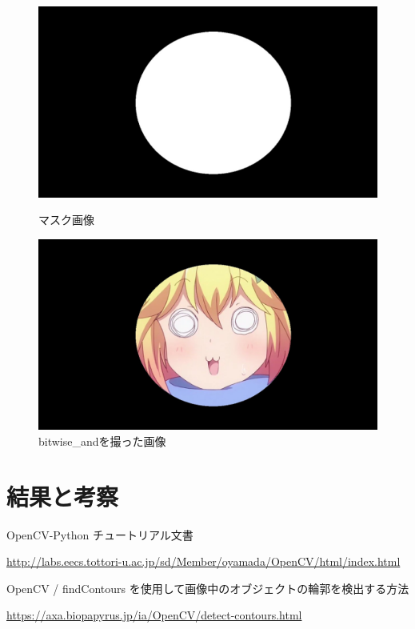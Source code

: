 \documentclass[dvipdfmx]{jsarticle}
\begin{document}
\begin{figure}
  \begin{minipage}{0.5\hsize}
    \centering
    \includegraphics[width=0.9\hsize]{../pic/black.jpg}
    \caption{マスク画像}
    \label{fig:mask1}
  \end{minipage}
  \begin{minipage}{0.5\hsize}
    \centering
    \includegraphics[width=0.9\hsize]{../pic/tapu_icon.jpg}
    \caption{bitwise\_andを撮った画像}
    \label{fig:masked1}
  \end{minipage}
\end{figure}




\section{結果と考察}



\begin{thebibliography}{10}
   OpenCV-Python チュートリアル文書
  
  \url{http://labs.eecs.tottori-u.ac.jp/sd/Member/oyamada/OpenCV/html/index.html}
  
   OpenCV / findContours を使用して画像中のオブジェクトの輪郭を検出する方法
  
  \url{https://axa.biopapyrus.jp/ia/OpenCV/detect-contours.html}
\end{thebibliography}
\end{document}
